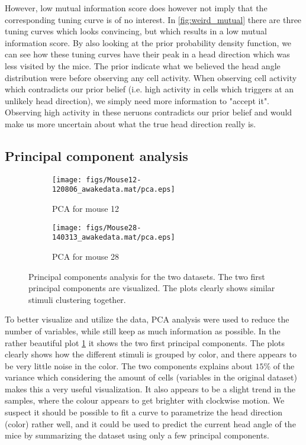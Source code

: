 However, low mutual information score does however not imply that the corresponding tuning curve is of no interest. In \cref{fig:weird_mutual} there are three tuning curves which looks convincing, but which results in a low mutual information score. By also looking at the prior probability density function, we can see how these tuning curves have their peak in a head direction which was less visited by the mice. The prior indicate what we believed the head angle distribution were before observing any cell activity. When observing cell activity which contradicts our prior belief (i.e. high activity in cells which triggers at an unlikely head direction), we simply need more information to "accept it". Observing high activity in these neruons contradicts our prior belief and would make us more uncertain about what the true head direction really is. 

\subsection{Principal component analysis}
\begin{figure}[H]
    \centering
    \begin{subfigure}[b]{0.4\textwidth}
        \texttt{[image: figs/Mouse12-120806\_awakedata.mat/pca.eps]}
        \caption{PCA for mouse 12}
    \end{subfigure}
    \begin{subfigure}[b]{0.4\textwidth}
        \texttt{[image: figs/Mouse28-140313\_awakedata.mat/pca.eps]}
        \caption{PCA for mouse 28}

    \end{subfigure}
    \caption{Principal components analysis for the two datasets. The two first principal components are visualized. The plots clearly shows similar stimuli clustering together.}
    \label{fig:pca}
\end{figure}
To better visualize and utilize the data, PCA analysis were used to reduce the number of variables, while still keep as much information as possible. In the rather beautiful plot \cref{fig:pca} it shows the two first principal components. The plots clearly shows how the different stimuli is grouped by color, and there appears to be very little noise in the color. The two components explains about $15\%$ of the variance which considering the amount of cells (variables in the original dataset) makes this a very useful visualization. 
It also appears to be a slight trend in the samples, where the colour appears to get brighter with clockwise motion. We suspect it should be possible to fit a curve to parametrize the head direction (color) rather well, and it could be used to predict the current head angle of the mice by summarizing the dataset using only a few principal components.  
